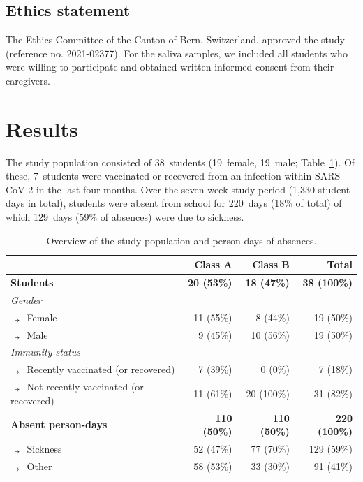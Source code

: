 \documentclass[fleqn,11pt]{wlscirep}
\begin{document}

\subsection{Ethics statement}

\noindent The Ethics Committee of the Canton of Bern, Switzerland, approved the study (reference no. 2021-02377). For the saliva samples, we included all students who were willing to participate and obtained written informed consent from their caregivers.


\newpage

\section{Results}

The study population consisted of 38~students (19~female, 19~male; Table~\ref{tab:cases-overview-school}). Of these, 7~students were vaccinated or recovered from an infection within SARS-CoV-2 in the last four months. Over the seven-week study period (1,330 student-days in total), students were absent from school for 220~days (18\% of total) of which 129~days (59\% of absences) were due to sickness.  

\begin{table}[!htpb]
    \centering
    \caption{Overview of the study population and person-days of absences.}
    \label{tab:cases-overview-school}
    \footnotesize
    \begin{tabular}{l r r r}
    \toprule
         &  Class A & Class B & Total \\ \midrule 
        \textbf{Students} & \textbf{20 (53\%)} & \textbf{18 (47\%)} & \textbf{38 (100\%)} \\
        \emph{Gender} \\
        $\drsh$ Female & 11 (55\%) & 8 (44\%) & 19 (\hphantom{0}50\%) \\
        $\drsh$ Male & 9 (45\%) & 10 (56\%) & 19 (\hphantom{0}50\%) \\
        \emph{Immunity status} \\
        $\drsh$ Recently vaccinated (or recovered) & 7 (39\%) & 0 (0\%) & 7 (\hphantom{0}18\%) \\
        $\drsh$ Not recently vaccinated (or recovered) & 11 (61\%) & 20 (100\%) & 31 (\hphantom{0}82\%) \\
        \textbf{Absent person-days} & \textbf{110 (50\%)} & \textbf{110 (50\%)} & \textbf{220 (100\%)} \\
        $\drsh$ Sickness & 52 (47\%) & 77 (70\%) & 129 (\hphantom{0}59\%) \\
        $\drsh$ Other & 58 (53\%) & 33 (30\%) & 91 (\hphantom{0}41\%) \\
        \bottomrule
    \end{tabular} 
\end{table}
\end{document}
